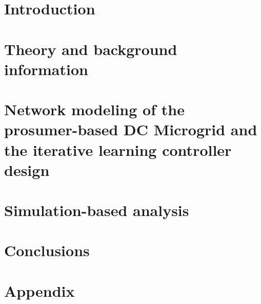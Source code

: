 \documentclass[a4paper,12pt,twoside]{kth-mag}
\begin{document}
\setlength{\parskip}{\baselineskip}
\setlength{\parindent}{0pt}

\mainmatter


\chapter{Introduction}
\label{ch:intro}


\chapter{Theory and background information}
\label{ch:theo}


\chapter{Network modeling of the prosumer-based DC Microgrid and the iterative learning controller design}
\label{sec:model}


\chapter{Simulation-based analysis}
\label{sec:simulation}


\chapter{Conclusions}
\label{sec:conclusions}






\nocite{paperilc}
\nocite{dg_wiki}
\nocite{epa_dg}
\nocite{Hatzi}
\nocite{concept}
\nocite{microgrid_concept}
\nocite{versus}
\nocite{lineloss}
\nocite{portm}
\nocite{prosumage}
\nocite{prosume}
\nocite{un_graph}
\nocite{graph_theory}
\nocite{lia_master}
\nocite{lia_stability}
\nocite{xiaohan_master}
\nocite{cs_princi}
\nocite{cs_princi_wiki}
\nocite{oploop}
\nocite{hier_control}
\nocite{controldc}
\nocite{controldc_energy_man}
\nocite{vl_ilc}
\nocite{moore_ilc}
\nocite{reduced_dc}
\nocite{voltage_droop}
\nocite{mikieus}

\chapter*{Appendix}
\label{appendix}

\end{document}
